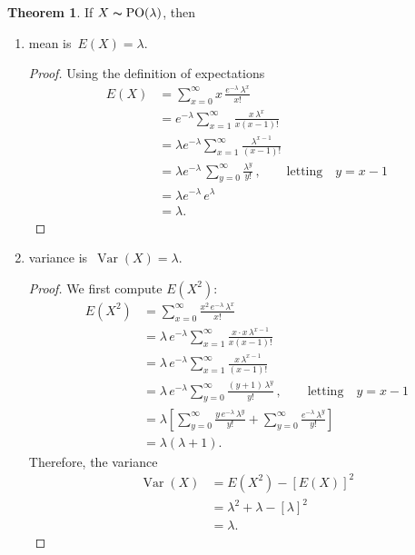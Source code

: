 \documentclass[12pt,a4paper]{report}
\theoremstyle{definition}
\newtheorem{thm}{Theorem}[section]
\theoremstyle{plain}
\theoremstyle{definition}
\begin{document}
\begin{thm}
If $X\thicksim \operatorname{PO}(\lambda)$, then 
\begin{enumerate}
\item mean is $\, E(X) = \lambda$.
\begin{proof}
Using the definition of expectations
\begin{align*}
E(X) & = \sum_{x = 0}^{\infty}x\, \frac{e^{-\lambda}\, \lambda^x}{x!}\\
& = e^{-\lambda}\sum^{\infty}_{x = 1}\frac{x\,\lambda^x}{x(x-1)!} \\
& = \lambda e^{-\lambda}\sum^{\infty}_{x = 1} \frac{\lambda^{x - 1}}{(x - 1)!}\\
& = \lambda e^{-\lambda}\, \sum^{\infty}_{y = 0} \frac{\lambda^y}{y!}\, ,\quad\quad \text{letting}\quad y = x - 1\\
& = \lambda e^{-\lambda}\, e^{\lambda}\\
& = \lambda.
\end{align*}
\end{proof}


\item variance is $\, \operatorname{Var}(X) = \lambda$.
\begin{proof}
We first compute $E(X^2)$:
\begin{align*}
E(X^2) & = \sum^{\infty}_{x = 0} \frac{x^2\, e^{-\lambda}\, \lambda^x}{x!}\\
& = \lambda\, e^{-\lambda} \sum^{\infty}_{x = 1}\frac{x\cdot x\, \lambda^{x - 1}}{x(x-1)!} \\
& = \lambda\, e^{-\lambda}\sum^{\infty}_{x = 1} \frac{x\, \lambda^{x - 1}}{(x - 1)!}\\
& = \lambda \, e^{-\lambda} \sum_{y = 0}^{\infty}\frac{(y+1)\, \lambda^{y}}{y!}\, , \quad\quad \text{letting}\quad y = x - 1\\
& = \lambda\left[\sum^{\infty}_{y = 0}\frac{y\,e^{-\lambda}\, \lambda^y}{y!} + \sum^{\infty}_{y = 0}\frac{e^{-\lambda}\, \lambda^y}{y!}\right]\\
& = \lambda(\lambda + 1).
\end{align*}
Therefore, the variance
\begin{align*}
\operatorname{Var}(X) & = E(X^2) - \left[E(X)\right]^2\\
& = \lambda^2 + \lambda - [\lambda]^2\\
& = \lambda.
\end{align*}
\end{proof}
\end{enumerate}
\end{thm}
\end{document}
